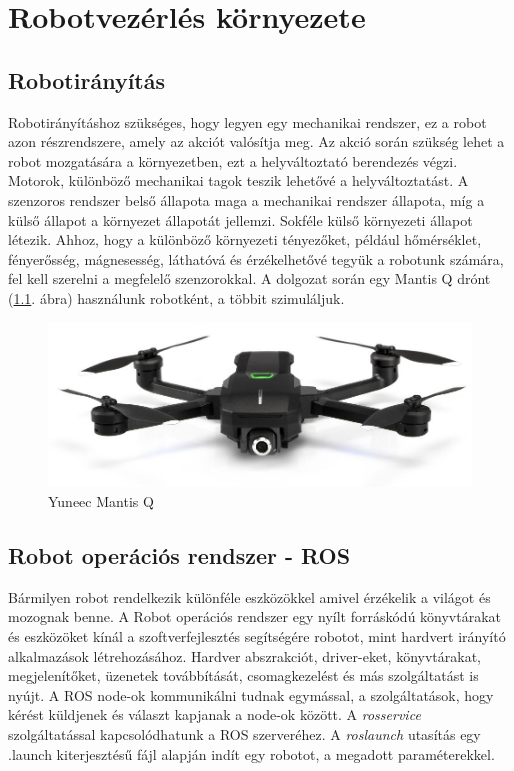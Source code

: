 \chapter{Robotvezérlés környezete}
\section{Robotirányítás}
Robotirányításhoz szükséges, hogy legyen egy mechanikai rendszer, ez a robot azon részrendszere, amely az akciót valósítja meg. Az akció során szükség lehet a robot mozgatására a környezetben,
ezt a helyváltoztató berendezés végzi. Motorok, különböző mechanikai tagok teszik lehetővé a helyváltoztatást. A szenzoros rendszer belső állapota maga a mechanikai rendszer állapota, míg a külső állapot a környezet állapotát jellemzi.
Sokféle külső környezeti állapot létezik. Ahhoz, hogy a különböző környezeti tényezőket, például hőmérséklet, fényerősség, mágnesesség, láthatóvá és érzékelhetővé tegyük a robotunk számára, fel kell szerelni a megfelelő szenzorokkal.  \cite{robtel}
A dolgozat során egy Mantis Q drónt (\ref{fig:mantisq}. ábra) használunk robotként, a többit szimuláljuk.

\begin{figure}
	\centering
	\includegraphics[width=\linewidth]{figures/mantisq.jpg}
	\caption{Yuneec Mantis Q \cite{mantisq}}
	\label{fig:mantisq}
\end{figure}

\section{Robot operációs rendszer - ROS}
Bármilyen robot rendelkezik különféle eszközökkel amivel érzékelik a világot és mozognak benne. A Robot operációs rendszer egy nyílt forráskódú könyvtárakat és eszközöket kínál a szoftverfejlesztés segítségére robotot, mint hardvert irányító alkalmazások létrehozásához. Hardver abszrakciót, driver-eket, könyvtárakat, megjelenítőket, üzenetek továbbítását, csomagkezelést és más szolgáltatást is nyújt. \cite{roswiki}
A ROS node-ok kommunikálni tudnak egymással, a szolgáltatások, hogy kérést küldjenek és választ kapjanak a node-ok között. A \emph{rosservice} szolgáltatással kapcsolódhatunk a ROS szerveréhez.
A \emph{roslaunch} utasítás egy .launch kiterjesztésű fájl alapján indít egy robotot, a megadott paraméterekkel.
